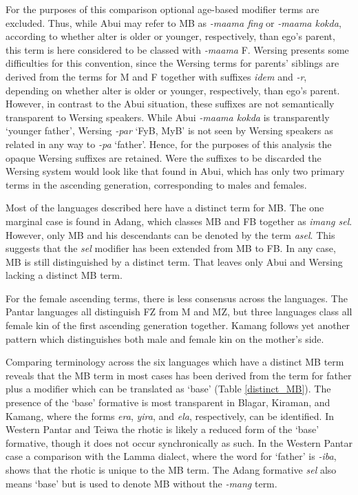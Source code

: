 For the purposes of this comparison optional age-based modifier terms are excluded. Thus, while Abui may refer to MB as \textit{-maama fing} or \textit{-maama kokda}, according to whether alter is older or younger, respectively, than ego's parent, this term is here considered to be classed with \textit{-maama} F. Wersing presents some difficulties for this convention, since the Wersing terms for parents' siblings are derived from the terms for M and F together with suffixes \textit{idem} and \textit{{}-r}, depending on whether alter is older or younger, respectively, than ego's parent. However, in contrast to the Abui situation, these suffixes are not semantically transparent to Wersing speakers. While Abui \textit{-maama kokda} is transparently `younger father', Wersing \textit{-par} `FyB, MyB' is not seen by Wersing speakers as related in any way to \textit{-pa} `father'. Hence, for the purposes of this analysis the opaque Wersing suffixes are retained. Were the suffixes to be discarded the Wersing system would look like that found in Abui, which has only two primary terms in the ascending generation, corresponding to males and females.

Most of the languages described here have a distinct term for MB. The one marginal case is found in Adang, which classes MB and FB together as \textit{imang sel}. However, only MB and his descendants can be denoted by the term \textit{asel}. This suggests that the \textit{sel} modifier has been extended from MB to FB. In any case, MB is still distinguished by a distinct term. That leaves only Abui and Wersing lacking a distinct MB term. 

For the female ascending terms, there is less consensus across the languages. The Pantar languages all distinguish FZ from M and MZ, but three languages class all female kin of the first ascending generation together. Kamang follows yet another pattern which distinguishes both male and female kin on the mother's side.

Comparing terminology across the six languages which have a distinct MB term reveals that the MB term in most cases has been derived from the term for father plus a modifier which can be translated as `base' (Table \ref{distinct_MB}). The presence of the `base' formative is most transparent in Blagar, Kiraman, and Kamang, where the forms \textit{era}, \textit{yira}, and \textit{ela}, respectively, can be identified. In Western Pantar and Teiwa the rhotic is likely a reduced form of the `base' formative, though it does not occur synchronically as such. In the Western Pantar case a comparison with the Lamma dialect, where the word for `father' is \textit{-iba}, shows that the rhotic is unique to the MB term. The Adang formative \textit{sel} also means `base' but is used to denote MB without the \textit{-mang} term.

